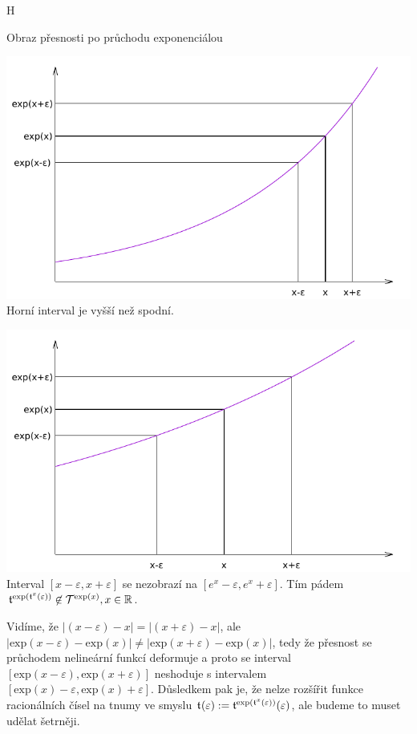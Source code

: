 \begin{myfigure}{H}
\caption{Obraz přesnosti po průchodu exponenciálou}
\includegraphics[width=\linewidth]{graphics/exp1.pdf}\label{fig:exp1}
Horní interval je vyšší než spodní.

\includegraphics[width=\linewidth]{graphics/exp4.pdf}\label{fig:exp4}
Interval $[x-\varepsilon,x+\varepsilon]$ se nezobrazí na $[e^x-\varepsilon,e^x+\varepsilon]$. Tím pádem $\mathfrak{t}^{\mathrm{exp}(\mathfrak{t}^{x}(\varepsilon))}\not\in\mathcal{T}^{\mathrm{exp}(x)},x\in\mathbb{R}$.
\end{myfigure}

Vidíme, že $|(x-\varepsilon)-x|=|(x+\varepsilon)-x|$, ale $|\mathrm{exp}(x-\varepsilon)-\mathrm{exp}(x)|\neq|\mathrm{exp}(x+\varepsilon)-\mathrm{exp}(x)|$, tedy že přesnost se průchodem nelineární funkcí deformuje a proto se interval $[\mathrm{exp}(x-\varepsilon),\mathrm{exp}(x+\varepsilon)]$ neshoduje s intervalem $[\mathrm{exp}(x)-\varepsilon,\mathrm{exp}(x)+\varepsilon]$. Důsledkem pak je, že nelze rozšířit funkce racionálních čísel na tnumy ve smyslu $\mathfrak{t}^{}(\varepsilon) := \mathfrak{t}^{\mathrm{exp}(\mathfrak{t}^{x}(\varepsilon))}(\varepsilon)$, ale budeme to muset udělat šetrněji.

